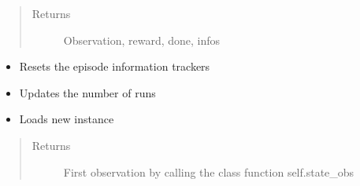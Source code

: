 \documentclass[letterpaper,10pt,english]{sphinxmanual}
\begin{document}
\begin{fulllineitems}
\begin{fulllineitems}
\begin{quote}
\begin{description}
\begin{itemize}
\end{itemize}

\item[{Returns}] \leavevmode
\sphinxAtStartPar
Observation, reward, done, infos

\end{description}\end{quote}

\end{fulllineitems}


\begin{fulllineitems}
\label{\detokenize{environments:environments.env_tetris_scheduling_indirect_action.IndirectActionEnv.reset}}\begin{itemize}
\item {} 
\sphinxAtStartPar
Resets the episode information trackers

\item {} 
\sphinxAtStartPar
Updates the number of runs

\item {} 
\sphinxAtStartPar
Loads new instance

\end{itemize}
\begin{quote}\begin{description}
\item[{Returns}] \leavevmode
\sphinxAtStartPar
First observation by calling the class function self.state\_obs

\end{description}\end{quote}

\end{fulllineitems}



\end{fulllineitems}
\end{document}

